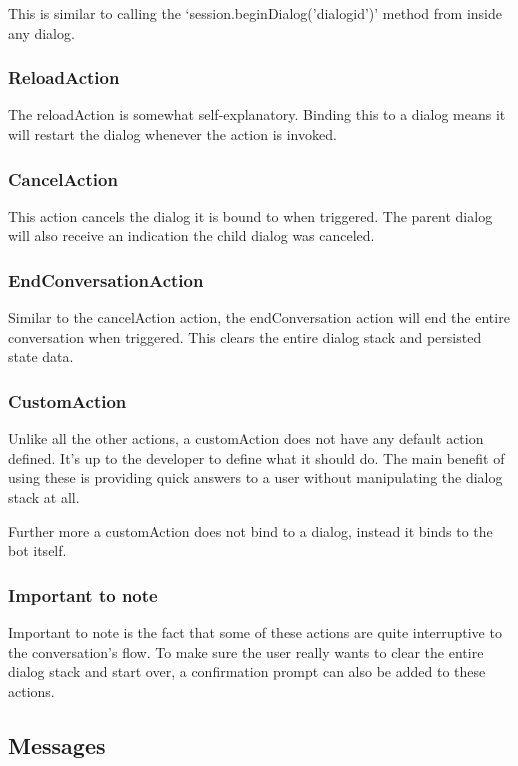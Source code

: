 This is similar to calling the `session.beginDialog('dialogid')' method from inside any dialog.

\subsubsection{ReloadAction}

The reloadAction is somewhat self-explanatory. Binding this to a dialog means it will restart the dialog whenever the action is invoked.

\subsubsection{CancelAction}

This action cancels the dialog it is bound to when triggered. The parent dialog will also receive an indication the child dialog was canceled.

\subsubsection{EndConversationAction}

Similar to the cancelAction action, the endConversation action will end the entire conversation when triggered. This clears the entire dialog stack and persisted state data.

\subsubsection{CustomAction}

Unlike all the other actions, a customAction does not have any default action defined. It's up to the developer to define what it should do. The main benefit of using these is providing quick answers to a user without manipulating the dialog stack at all.

Further more a customAction does not bind to a dialog, instead it binds to the bot itself.

\subsubsection{Important to note}

Important to note is the fact that some of these actions are quite interruptive to the conversation's flow. To make sure the user really wants to clear the entire dialog stack and start over, a confirmation prompt can also be added to these actions.

\subsection{Messages}


